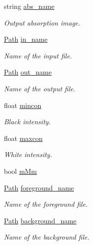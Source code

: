 \begin{DoxyCompactItemize}
string \hyperlink{structclargs_ae26e4b09db8c69aa2585f1d7e35233ec}{abs\_\-name}
\begin{DoxyCompactList}\small\item\em Output absorption image. \item\end{DoxyCompactList}\item 
\hyperlink{classPath}{Path} \hyperlink{structclargs_a84359d967cb5060793f72543b83093ff}{in\_\-name}
\begin{DoxyCompactList}\small\item\em Name of the input file. \item\end{DoxyCompactList}\item 
\hyperlink{classPath}{Path} \hyperlink{structclargs_a6e3fc2c758fc6f5a376f67f5a17748da}{out\_\-name}
\begin{DoxyCompactList}\small\item\em Name of the output file. \item\end{DoxyCompactList}\item 
float \hyperlink{structclargs_acb43c41b73b9cfed1133cb13a32f4573}{mincon}
\begin{DoxyCompactList}\small\item\em Black intensity. \item\end{DoxyCompactList}\item 
float \hyperlink{structclargs_ae2abd48864e4ba3558d55ea7be88c692}{maxcon}
\begin{DoxyCompactList}\small\item\em White intensity. \item\end{DoxyCompactList}\item 
bool \hyperlink{structclargs_ad4ca5e72b43d31b3275721a53611149d}{mMm}
\item 
\hyperlink{classPath}{Path} \hyperlink{structclargs_ab68bba2b3fe0c92406d81829008a8365}{foreground\_\-name}
\begin{DoxyCompactList}\small\item\em Name of the foreground file. \item\end{DoxyCompactList}\item 
\hyperlink{classPath}{Path} \hyperlink{structclargs_a87826797d093707077f17f634316eb3e}{background\_\-name}
\begin{DoxyCompactList}\small\item\em Name of the background file. \item\end{DoxyCompactList}\item 

\end{DoxyCompactItemize}
